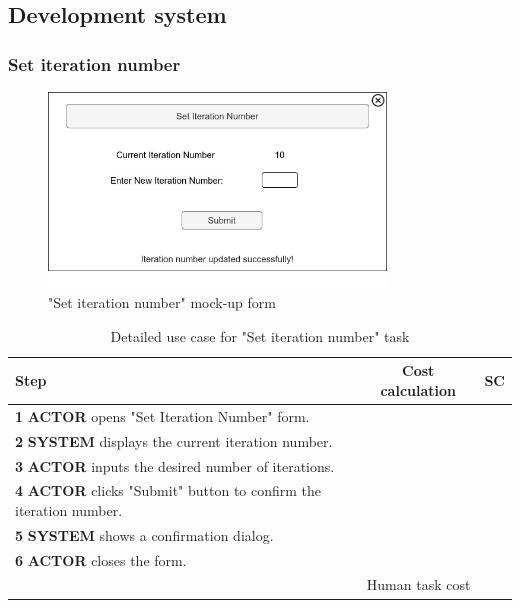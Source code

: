 \subsection{Development system}

\subsubsection{Set iteration number}

\begin{figure}[H]
\centering
\includegraphics[width=0.8\textwidth]{figures/set_iteration_number.png}
\caption{"Set iteration number" mock-up form}
\end{figure}

\begin{table}[H]
\centering
\begin{tabular}{|l|c|c|}
\hline
\textbf{Step} & \textbf{Cost calculation} & \textbf{SC} \\
\hline
\textbf{1} \textbf{ACTOR} opens "Set Iteration Number" form. & & \\
\hline
\textbf{2} \textbf{SYSTEM} displays the current iteration number. & & \\
\hline
\textbf{3} \textbf{ACTOR} inputs the desired number of iterations. & & \\
\hline
\textbf{4} \textbf{ACTOR} clicks "Submit" button to confirm the iteration number. & & \\
\hline
\textbf{5} \textbf{SYSTEM} shows a confirmation dialog. & & \\
\hline
\textbf{6} \textbf{ACTOR} closes the form. & & \\
\hline
\multicolumn{2}{|r|}{Human task cost} & \\
\hline
\end{tabular}
\caption{Detailed use case for "Set iteration number" task}
\label{table:set_iteration_number}
\end{table}